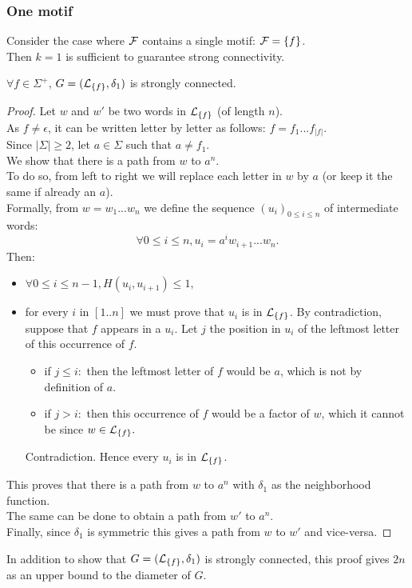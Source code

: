 \documentclass{article}
\begin{document}
\subsubsection{One motif}

Consider the case where $\mathcal{F}$ contains a single motif: $\mathcal{F} = \{f\}$. \\
Then $k = 1$ is sufficient to guarantee strong connectivity.
\begin{result}
	$\forall f \in \Sigma^+$, $G = (\mathcal{L}_{\{f\}}, \delta_1)$ is strongly connected.
\end{result}
\begin{proof}
	Let $w$ and $w'$ be two words in $\mathcal{L}_{\{f\}}$ (of length $n$). \\
	As $f \neq \epsilon$, it can be written letter by letter as follows: $f = f_1 ... f_{|f|}$. \\
	Since $|\Sigma| \geq 2$, let $a \in \Sigma$ such that $a \neq f_1$. \\
	We show that there is a path from $w$ to $a^n$. \\
	To do so, from left to right we will replace each letter in $w$ by $a$ (or keep it the same if already an $a$). \\
	Formally, from $w = w_1 ... w_n$ we define the sequence $(u_i)_{0 \leq i \leq n}$ of intermediate words:
	$$ \forall 0 \leq i \leq n, u_i = a^i w_{i+1} ... w_n.$$
	Then:
	\begin{itemize}
		\item $\forall 0 \leq i \leq n - 1, H(u_i, u_{i+1}) \leq 1,$
		\item for every $i$ in $[1..n]$ we must prove that $u_i$ is in $\mathcal{L}_{\{f\}}$. By contradiction, suppose that $f$ appears in a $u_i$. Let $j$ the position in $u_i$ of the leftmost letter of this occurrence of $f$.
		\begin{itemize}
			\item if $j \leq i:$ then the leftmost letter of $f$ would be $a$, which is not by definition of $a$.
			\item if $j > i:$ then this occurrence of $f$ would be a factor of $w$, which it cannot be since $w \in \mathcal{L}_{\{f\}}.$
		\end{itemize}
	Contradiction. Hence every $u_i$ is in $\mathcal{L}_{\{f\}}$.
	\end{itemize}
	This proves that there is a path from $w$ to $a^n$ with $\delta_1$ as the neighborhood function. \\
	The same can be done to obtain a path from $w'$ to $a^n$. \\
	Finally, since $\delta_1$ is symmetric this gives a path from $w$ to $w'$ and vice-versa.	
\end{proof}

In addition to show that $G = (\mathcal{L}_{\{f\}}, \delta_1)$ is strongly connected, this proof gives $2n$ as an upper bound to the diameter of $G$.
\end{document}
